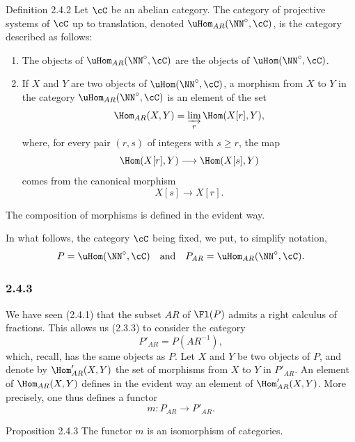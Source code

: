 \begin{statement}{Definition 2.4.2}
Let $\cC$ be an abelian category. The category of projective systems of $\cC$ up to translation, denoted $\uHom_{AR}(\NN^\circ,\cC)$, is the category described as follows:
\begin{enumerate}[label=(\roman*)]
\item The objects of $\uHom_{AR}(\NN^\circ,\cC)$ are the objects of $\uHom(\NN^\circ,\cC)$.
\item If $X$ and $Y$ are two objects of $\uHom(\NN^\circ,\cC)$, a morphism from $X$ to $Y$ in the category $\uHom_{AR}(\NN^\circ,\cC)$ is an element of the set
\[
\Hom_{AR}(X,Y)=\varinjlim_r\Hom(X[r],Y),
\]
where, for every pair $(r,s)$ of integers with $s\ge r$, the map
\[
\Hom(X[r],Y)\longrightarrow\Hom(X[s],Y)
\]
comes from the canonical morphism
\[
X[s]\longrightarrow X[r].
\]
\end{enumerate}
The composition of morphisms is defined in the evident way.
\end{statement}
In what follows, the category $\cC$ being fixed, we put, to simplify notation,
\[
P=\uHom(\NN^\circ,\cC)\quad\text{and}\quad P_{AR}=\uHom_{AR}(\NN^\circ,\cC).
\]

\subsubsection*{2.4.3}
We have seen (2.4.1) that the subset $AR$ of $\Fl(P)$ admits a right calculus of fractions. This allows us (2.3.3) to consider the category
\[
P'_{AR}=P(AR^{-1}),
\]
which, recall, has the same objects as $P$. Let $X$ and $Y$ be two objects of $P$, and denote by $\Hom'_{AR}(X,Y)$ the set of morphisms from $X$ to $Y$ in $P'_{AR}$. An element of $\Hom_{AR}(X,Y)$ defines in the evident way an element of $\Hom'_{AR}(X,Y)$. More precisely, one thus defines a functor
\[
m:P_{AR}\longrightarrow P'_{AR}.
\]

\begin{statement}{Proposition 2.4.3}
The functor $m$ is an isomorphism of categories.
\end{statement}

